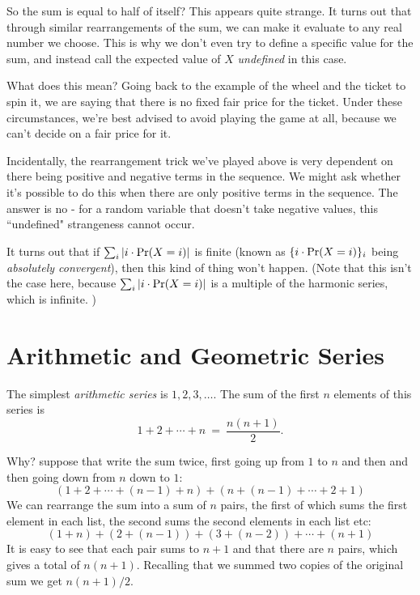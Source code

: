 So the sum is equal to half of itself? 
This appears quite strange. 
It turns out that through similar rearrangements of the sum, 
we can make it evaluate to any real number we choose. 
This is why we don't even try to define a specific value for the sum, 
and instead call the expected value of $X$ \emph{undefined} in this case.

What does this mean? 
Going back to the example of the wheel and the ticket to spin it, we are saying that there is no fixed fair price for the ticket. 
Under these circumstances, we're best advised to avoid playing the game at all, 
because we can't decide on a fair price for it.

Incidentally, the rearrangement trick we've played above is very dependent on there being positive and negative terms in the sequence. 
We might ask whether it's possible to do this when there are only positive terms in the sequence. 
The answer is no - for a random variable that doesn't take negative values, this ``undefined" strangeness cannot occur. 

It turns out that if $\sum_i |i \cdot \mbox{\rm Pr}(X = i)|$ is finite (known as $\{i \cdot \mbox{\rm Pr}(X = i) \}_i$ being \emph{absolutely convergent}), then this kind of thing won't happen. 
(Note that this isn't the case here, because $\sum_i \left| i \cdot \mbox{\rm Pr}(X = i) \right|$ is a multiple of the harmonic series, which is infinite. )




\section{Arithmetic and Geometric Series}

The simplest {\it arithmetic series} is $1,2,3,\ldots$. The sum of the first 
$n$ elements of this series is
$$ 1 + 2 + \cdots + n \ = \ \frac{n(n+1)}{2} .$$

Why? suppose that write the sum twice, first going up from $1$ to $n$
and then and then going down from $n$ down to $1$:
$$ \left(1 + 2 + \cdots + (n-1) + n\right) + 
\left(n + (n-1) + \cdots + 2 + 1\right) $$
We can rearrange the sum into a sum of $n$ pairs, the first of which
sums the first element in each list, the second sums the second
elements in each list etc:
$$ (1+n) + (2+(n-1)) + (3+(n-2)) + \cdots + (n+1) $$
It is easy to see that each pair sums to $n+1$ and that there are $n$
pairs, which gives a total of $n(n+1)$. Recalling that we summed two
copies of the original sum we get $n(n+1)/2$.


